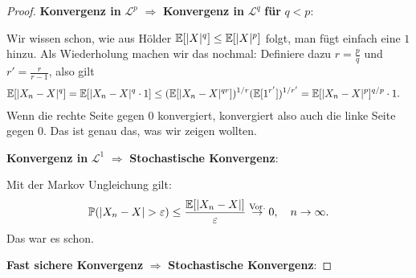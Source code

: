 \begin{proof}
	\textbf{Konvergenz in } $\mathcal L^p$ \text{ } $\Rightarrow$ \textbf{ Konvergenz in } $\mathcal L^q$ \textbf{ f\"ur } $q<p$:  
	
	Wir wissen schon, wie aus H\"older $\mathbb{E}[|X|^q]\leq \mathbb{E}[|X|^p]$ folgt, man f\"ugt einfach eine $1$ hinzu. Als Wiederholung machen wir das nochmal: Definiere dazu $r = \frac{p}{q}$ und $r'=\frac{r}{r-1}$, also gilt
	\begin{align*}
		\mathbb{E}[|X_n - X|^q]& = \mathbb{E}[ |X_n - X|^q\cdot 1]
		 \leq(\mathbb{E}[|X_n - X|^{qr}])^{1/{r}} (\mathbb{E}[1^{r'}])^{1/{r'}}
		 =  \mathbb{E}[|X_n - X|^p]^{q/p}\cdot 1.
	\end{align*}
	Wenn die rechte Seite gegen $0$ konvergiert, konvergiert also auch die linke Seite gegen $0$. Das ist genau das, was wir zeigen wollten.\smallskip
	
\textbf{Konvergenz in } $\mathcal L^1$\text{ }  $\Rightarrow$ \textbf{ Stochastische Konvergenz}: 

Mit der Markov Ungleichung gilt:
\begin{align*}
	\mathbb{P}(|X_n - X| > \varepsilon) \leq \frac{\mathbb{E}[|X_n - X|]}{\varepsilon} \overset{\text{Vor.}}{\rightarrow }0,\quad n \to \infty.
\end{align*}
Das war es schon.\smallskip

\textbf{Fast sichere Konvergenz } $\Rightarrow$ \textbf{ Stochastische Konvergenz}:


\end{proof}
